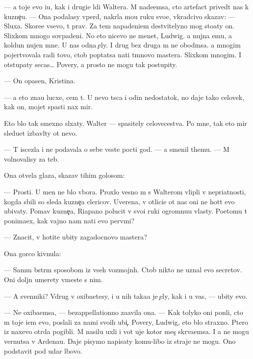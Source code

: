 \documentclass[10pt]{book}
\begin{document}
— {\Y}a toje {\y}evo i{\x}u, kak i drugi{\y}e l{\io}di Waltera. M{\yi} nade{\y}emsa, cto artefact prived{\e}t nas k kuzne{\c}u. — Ona podalasy vper{\e}d, nakr{\yi}la mo{\y}u ruku svo{\y}e{\y}, vkradcivo skazav: — Sluxa{\y}. Skore{\y}e vsevo, t{\yi} prav. Za tem napadeni{\y}em de{\y}stvitelyno mog sto{\y}aty on. Slixkom mnogo sovpadeni{\y}. No eto nicevo ne men{\ia}{\y}et, Ludwig. {\Y}a nujna {\y}emu, a koldun nujen mne. U nas odna {\c}ely. I drug bez druga m{\yi} ne obo{\y}d{\e}msa. {\Y}a mnogim pojertvovala radi tovo, ctob{\yi} pop{\yi}tatsa na{\y}ti t{\e}mnovo mastera. Slixkom mnogim. I otstupaty se{\y}cas… Povery, {\y}a prosto ne mogu tak postupity.

— On opasen, Kristina.

— {\Y}a eto zna{\y}u lucxe, cem t{\yi}. U nevo t{\yi}s{\ia}ca i odin nedostatok, no daje tako{\y} celovek, kak on, mojet spasti nax mir.

Eto b{\yi}lo tak smexno sl{\yi}xaty. Walter — spasitely celovecestva. Po mne, tak eto mir sledu{\y}et izbavl{\ia}ty ot nevo.

— T{\yi} iscezla i ne podavala o sebe veste{\y} pocti god. — {\Y}a smenil themu. — M{\yi} volnovalisy za teb{\ia}.

Ona otvela glaza, skazav tihim golosom:

— Prosti. U men{\ia} ne b{\yi}lo v{\yi}bora. Proxlo{\y} vesno{\y} m{\yi} s Walterom vlipli v nepri{\y}atnosti, kogda sbili so sleda kuzne{\c}a clericov. Uverena, v otlici{\y}e ot nas oni ne hot{\ia}t {\y}evo ubivaty. Po{\y}mav kuzne{\c}a, Riapano polucit v svo{\y}i ruki ogromnu{\y}u vlasty. Poetomu t{\yi} ponima{\y}ex, kak vajno nam na{\y}ti {\y}evo perv{\yi}mi?

— Znacit, v{\yi} hotite ubity zagadocnovo mastera?

Ona gor{\ia}co kivnula:

— Sam{\yi}m b{\yi}str{\yi}m sposobom iz vseh vozmojn{\yi}h. Ctob{\yi} nikto ne uznal {\y}evo secretov. Oni doljn{\yi} umerety vmeste s nim.

— A sv{\ia}{\x}enniki? Vdrug v{\yi} oxiba{\y}etesy, i u nih taka{\y}a je {\c}ely, kak i u vas, — ubity {\y}evo.

— Ne oxiba{\y}emsa, — bezappellationno za{\y}avila ona. — Kak tolyko oni pon{\ia}li, cto m{\yi} toje i{\x}em {\y}evo, poslali za nami svo{\y}ih ubi{\y}{\c}. Povery, Ludwig, eto b{\yi}lo straxno. P{\ia}tero iz naxevo otr{\ia}da pogibli. M{\yi} nasilu uxli i vot uje kotor{\yi}{\y} mes{\ia}{\c} skr{\yi}va{\y}emsa. I {\y}a ne mogu vernutsa v Ardenau. Daje pisymo napisaty komu-libo iz straje{\y} ne mogu. Ono podstavit pod udar l{\io}bovo.
\end{document}
